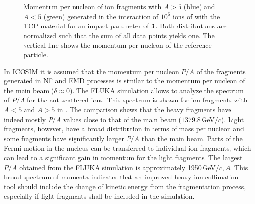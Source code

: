 \begin{figure}[htbp]
  \centering
  \caption{Momentum per nucleon of ion fragments with $A>5$ (blue) and $A<5$ (green) generated in the interaction of $10^6$ ions of \lead with the TCP material for an impact parameter of $3\,$\mum. Both distributions are normalized such that the sum of all data points yields one. The vertical line shows the momentum per nucleon of the reference particle.}  
  \label{pic:15091701}
  \end{figure}


In ICOSIM it is assumed that the momentum per nucleon $P/A$ of the fragments generated in NF and EMD processes is similar to the momentum per nucleon of the main beam ($\delta \approx 0$). The FLUKA simulation allows to analyze the spectrum of $P/A$ for the out-scattered ions. This spectrum is shown for ion fragments with $A<5$ and $A>5$ in . The comparison shows that the heavy fragments have indeed mostly $P/A$ values close to that of the main beam ($1379.8\,$GeV$/c$). Light fragments, however, have a broad distribution in terms of mass per nucleon and some fragments have significantly larger $P/A$ than the main beam. Parts of the Fermi-motion in the nucleus can be transferred to individual ion fragments, which can lead to a significant gain in momentum for the light fragments. The largest $P/A$ obtained from the FLUKA simulation is approximately 1950$\,$GeV$/c, A$. This broad spectrum of momenta indicates that an improved heavy-ion collimation tool should include the change of kinetic energy from the fragmentation process, especially if light fragments shall be included in the simulation.











